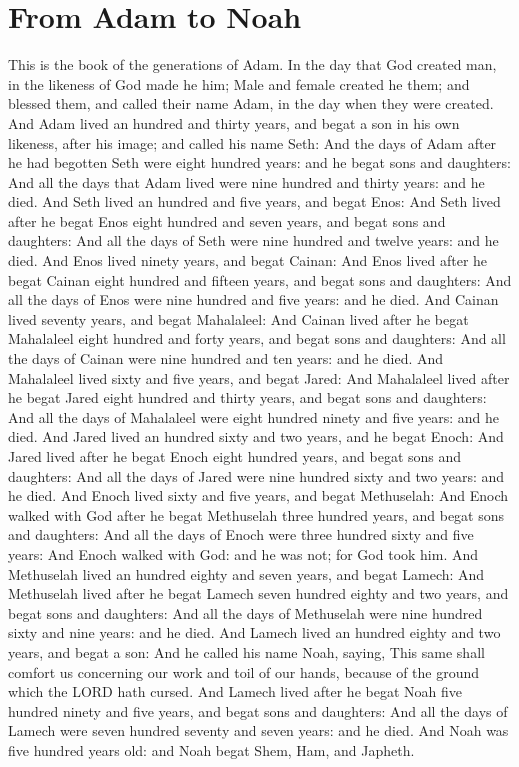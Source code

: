 \section*{From Adam to Noah}
\begin{biblechapter} %
\verse This is the book of the generations of Adam. In the day that God created man, in the likeness of God made he him;
\verse Male and female created he them; and blessed them, and called their name Adam, in the day when they were created.
\verse And Adam lived an hundred and thirty years, and begat a son in his own likeness, after his image; and called his name Seth:
\verse And the days of Adam after he had begotten Seth were eight hundred years: and he begat sons and daughters:
\verse And all the days that Adam lived were nine hundred and thirty years: and he died.
\verse And Seth lived an hundred and five years, and begat Enos:
\verse And Seth lived after he begat Enos eight hundred and seven years, and begat sons and daughters:
\verse And all the days of Seth were nine hundred and twelve years: and he died.
\verse And Enos lived ninety years, and begat Cainan:
\verse And Enos lived after he begat Cainan eight hundred and fifteen years, and begat sons and daughters:
\verse And all the days of Enos were nine hundred and five years: and he died.
\verse And Cainan lived seventy years, and begat Mahalaleel:
\verse And Cainan lived after he begat Mahalaleel eight hundred and forty years, and begat sons and daughters:
\verse And all the days of Cainan were nine hundred and ten years: and he died.
\verse And Mahalaleel lived sixty and five years, and begat Jared:
\verse And Mahalaleel lived after he begat Jared eight hundred and thirty years, and begat sons and daughters:
\verse And all the days of Mahalaleel were eight hundred ninety and five years: and he died.
\verse And Jared lived an hundred sixty and two years, and he begat Enoch:
\verse And Jared lived after he begat Enoch eight hundred years, and begat sons and daughters:
\verse And all the days of Jared were nine hundred sixty and two years: and he died.
\verse And Enoch lived sixty and five years, and begat Methuselah:
\verse And Enoch walked with God after he begat Methuselah three hundred years, and begat sons and daughters:
\verse And all the days of Enoch were three hundred sixty and five years:
\verse And Enoch walked with God: and he was not; for God took him.
\verse And Methuselah lived an hundred eighty and seven years, and begat Lamech:
\verse And Methuselah lived after he begat Lamech seven hundred eighty and two years, and begat sons and daughters:
\verse And all the days of Methuselah were nine hundred sixty and nine years: and he died.
\verse And Lamech lived an hundred eighty and two years, and begat a son:
\verse And he called his name Noah, saying, This same shall comfort us concerning our work and toil of our hands, because of the ground which the LORD hath cursed.
\verse And Lamech lived after he begat Noah five hundred ninety and five years, and begat sons and daughters:
\verse And all the days of Lamech were seven hundred seventy and seven years: and he died.
\verse And Noah was five hundred years old: and Noah begat Shem, Ham, and Japheth.
\end{biblechapter}

